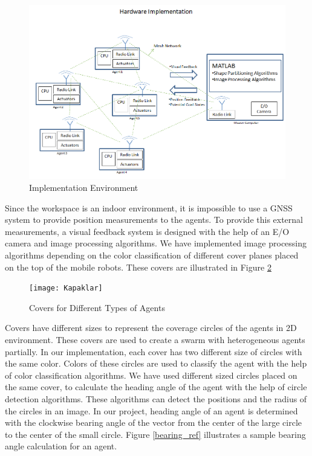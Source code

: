 \begin{figure}[H]
\caption{Implementation Environment} \label{harware_ref}
\centerline{\includegraphics[scale = 0.55]{hardware}}
\end{figure} 

Since the workspace is an indoor environment, it is impossible to use a GNSS system to provide position measurements to the agents. To provide this external measurements, a visual feedback system is designed with the help of an E/O camera and image processing algorithms. We have implemented image processing algorithms depending on the color classification of different cover planes placed on the top of the mobile robots. These covers are illustrated in Figure \ref{kapaklar_ref}

\begin{figure}[H]
\caption{Covers for Different Types of Agents} \label{kapaklar_ref}
\centerline{\texttt{[image: Kapaklar]}}
\end{figure} 
		
Covers have different sizes to represent the coverage circles of the agents in 2D environment. These covers are used to create a swarm with heterogeneous agents partially. In our implementation, each cover has two different size of circles with the same color. Colors of these circles are used to classify the agent with the help of color classification algorithms. We have used different sized circles placed on the same cover, to calculate the heading angle of the agent with the help of circle detection algorithms. These algorithms can detect the positions and the radius of the circles in an image. In our project, heading angle of an agent is determined with the clockwise bearing angle of the vector from the center of the large circle to the center of the small circle. Figure \ref{bearing_ref} illustrates a sample bearing angle calculation for an agent.
		
